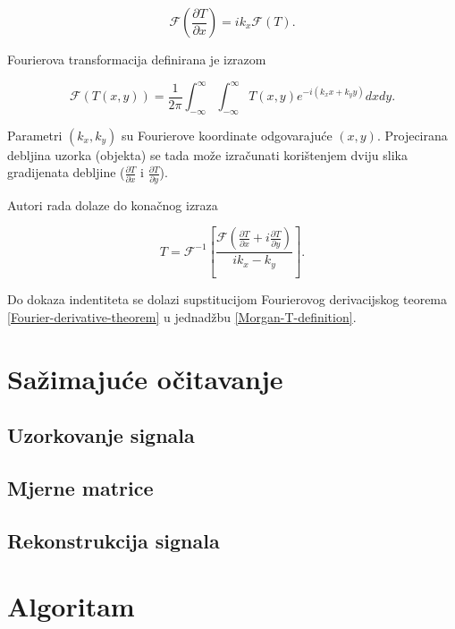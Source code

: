\documentclass[times, utf8, diplomski, numeric]{fer}
\begin{document}
\begin{equation}
	\label{Fourier-derivative-theorem}
	\mathcal{F}\left(\frac{\partial T}{\partial x}\right) = ik_x\mathcal{F}(T).
\end{equation}

Fourierova transformacija definirana je izrazom

\begin{equation}
\label{Fourier-definition}
\mathcal{F}\left(T(x,y)\right) = \frac{1}{2\pi}\int_{-\infty}^{\infty}\int_{-\infty}^{\infty}T(x,y)e^{-i(k_xx+k_yy)}dxdy.
\end{equation}

Parametri $(k_x,k_y)$ su Fourierove koordinate odgovarajuće $(x,y)$. Projecirana debljina uzorka (objekta) se tada može izračunati korištenjem dviju slika gradijenata debljine ($\frac{\partial T}{\partial x}$ i $\frac{\partial T}{\partial y}$).

Autori rada \cite{Morgan:11} dolaze do konačnog izraza

\begin{equation}
	\label{Morgan-T-definition}
	T = \mathcal{F}^{-1}\left[\frac{\mathcal{F}\left(\frac{\partial T}{\partial x} + i\frac{\partial T}{\partial y}\right)}{ik_x - k_y}\right].
\end{equation}

Do dokaza indentiteta se dolazi supstitucijom Fourierovog derivacijskog teorema \ref{Fourier-derivative-theorem} u jednadžbu \ref{Morgan-T-definition}. 










\chapter{Sažimajuće očitavanje}
\section{Uzorkovanje signala}
\section{Mjerne matrice}\label{mjerne_matrice}
\section{Rekonstrukcija signala}

\chapter{Algoritam}
\end{document}
